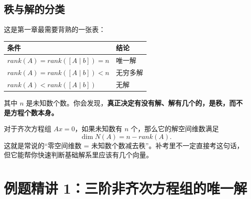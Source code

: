 \documentclass[11pt,oneside,UTF8]{ctexbook}
\newcommand{\important}[1]{\textcolor{Sakura}{\textbf{#1}}}
\begin{document}
\subsection{秩与解的分类}

这是第一章最需要背熟的一张表：

\begin{center}
\begin{tabularx}{0.94\textwidth}{>{\raggedright\arraybackslash}X>{\raggedright\arraybackslash}X}
\toprule
条件 & 结论\\
\midrule
\(rank(A)=rank([A\mid b])=n\) & 唯一解\\
\(rank(A)=rank([A\mid b])<n\) & 无穷多解\\
\(rank(A)<rank([A\mid b])\) & 无解\\
\bottomrule
\end{tabularx}
\end{center}

其中 \(n\) 是未知数个数。你会发现，\important{真正决定有没有解、解有几个的，是秩，而不是方程个数本身。}

\begin{summarybox}
对于齐次方程组 \(Ax=0\)，如果未知数有 \(n\) 个，那么它的解空间维数满足
\[
\dim N(A)=n-rank(A).
\]
这就是常说的“零空间维数 = 未知数个数减去秩”。补考里不一定直接考这句话，但它能帮你快速判断基础解系里应该有几个向量。
\end{summarybox}

\section{例题精讲 1：三阶非齐次方程组的唯一解}
\end{document}
